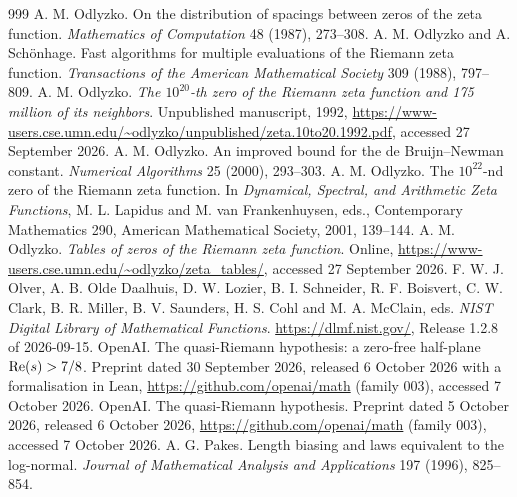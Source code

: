 \begin{thebibliography}{999}
 A. M. Odlyzko. On the distribution of spacings between zeros of the zeta function. \emph{Mathematics of Computation} 48 (1987), 273--308.
 A. M. Odlyzko and A. Sch\"onhage. Fast algorithms for multiple evaluations of the Riemann zeta function. \emph{Transactions of the American Mathematical Society} 309 (1988), 797--809.
 A. M. Odlyzko. \emph{The $10^{20}$-th zero of the Riemann zeta function and 175 million of its neighbors}. Unpublished manuscript, 1992, \url{https://www-users.cse.umn.edu/~odlyzko/unpublished/zeta.10to20.1992.pdf}, accessed 27 September 2026.
 A. M. Odlyzko. An improved bound for the de Bruijn--Newman constant. \emph{Numerical Algorithms} 25 (2000), 293--303.
 A. M. Odlyzko. The $10^{22}$-nd zero of the Riemann zeta function. In \emph{Dynamical, Spectral, and Arithmetic Zeta Functions}, M. L. Lapidus and M. van Frankenhuysen, eds., Contemporary Mathematics 290, American Mathematical Society, 2001, 139--144.
 A. M. Odlyzko. \emph{Tables of zeros of the Riemann zeta function}. Online, \url{https://www-users.cse.umn.edu/~odlyzko/zeta_tables/}, accessed 27 September 2026.
 F. W. J. Olver, A. B. Olde Daalhuis, D. W. Lozier, B. I. Schneider, R. F. Boisvert, C. W. Clark, B. R. Miller, B. V. Saunders, H. S. Cohl and M. A. McClain, eds. \emph{NIST Digital Library of Mathematical Functions}. \url{https://dlmf.nist.gov/}, Release 1.2.8 of 2026-09-15.
 OpenAI. The quasi-Riemann hypothesis: a zero-free half-plane $\operatorname{Re}(s)>7/8$. Preprint dated 30 September 2026, released 6 October 2026 with a formalisation in Lean, \url{https://github.com/openai/math} (family 003), accessed 7 October 2026.
 OpenAI. The quasi-Riemann hypothesis. Preprint dated 5 October 2026, released 6 October 2026, \url{https://github.com/openai/math} (family 003), accessed 7 October 2026.
 A. G. Pakes. Length biasing and laws equivalent to the log-normal. \emph{Journal of Mathematical Analysis and Applications} 197 (1996), 825--854.

\end{thebibliography}
